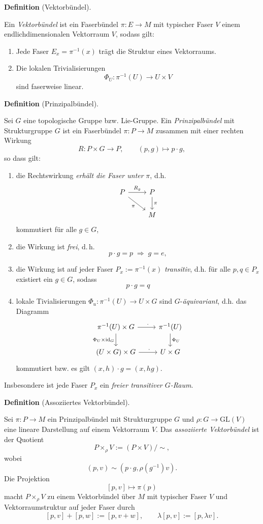 \documentclass[10pt, letterpaper]{article}
\newcommand{\id}{\operatorname{id}}
\newcommand{\GL}{\mathrm{GL}}
\newcommand{\CustomHeading}[3]{%
  \par\medskip\noindent%
  \textbf{#1 #2} \textnormal{(#3)}.\enskip%
}
\newenvironment{DEF}[2]{\CustomHeading{Definition}{#1}{#2}}{}
\begin{document}
\begin{DEF}{}{Vektorbündel}
Ein \emph{Vektorbündel} ist ein Faserbündel $\pi:E\to M$ mit typischer Faser $V$ einem endlichdimensionalen Vektorraum $V$, sodass gilt:
\begin{enumerate}
  \item Jede Faser $E_x=\pi^{-1}(x)$ trägt die Struktur eines Vektorraums.
  \item Die lokalen Trivialisierungen
        \[
        \Phi_U:\pi^{-1}(U)\to U\times V
        \]
        sind faserweise linear.
\end{enumerate}
\end{DEF}

\begin{DEF}{}{Prinzipalbündel}
Sei $G$ eine topologische Gruppe bzw. Lie-Gruppe. Ein \emph{Prinzipalbündel}
mit Strukturgruppe $G$ ist ein Faserbündel $\pi:P\to M$ zusammen mit einer rechten Wirkung
\[
R: P\times G\to P,\qquad (p,g)\mapsto p\cdot g,
\]
so dass gilt:
\begin{enumerate}
    \item die Rechtswirkung \emph{erhält die Faser unter} $\pi$, d.h. 
    \[
    \begin{tikzcd}
    P \arrow[r,"R_g"] \arrow[dr,"\pi"'] & P \arrow[d,"\pi"] \\
    & M
    \end{tikzcd}
    \]
    kommutiert für alle $g\in G$,
    \item die Wirkung ist \emph{frei}, d.\,h.
    \[
    p\cdot g=p \;\Rightarrow\; g=e,
    \]
    \item die Wirkung ist auf jeder Faser $P_x:=\pi^{-1}(x)$ \emph{transitiv}, d.h. für alle $p,q\in P_x$ existiert ein $g\in G$, sodass 
    $$p\cdot g=q$$
    \item lokale Tivialisierungen $\Phi_u:\pi^{-1}(U)\to U\times G$ sind $G$-\emph{äquivariant}, d.h. das Diagramm
    \[
    \begin{tikzcd}
    \pi^{-1}(U)\times G \arrow[r,"\ \ \cdot\ "] \arrow[d,"\Phi_U\times \id_G"'] & \pi^{-1}(U) \arrow[d,"\Phi_U"] \\
    (U\times G)\times G \arrow[r,"\ \ \cdot\ "] & U\times G
    \end{tikzcd}
    \]
    kommutiert bzw. es gilt $(x,h)\cdot g=(x,hg)$.
\end{enumerate}
Insbesondere ist jede Faser $P_x$ ein \emph{freier transitiver $G$-Raum}.
\end{DEF}


\begin{DEF}{}{Assoziiertes Vektorbündel}
Sei \(\pi:P\to M\) ein Prinzipalbündel mit Strukturgruppe \(G\) und $\rho:G\to \GL(V)$ eine lineare Darstellung auf einem Vektorraum \(V\). Das \emph{assoziierte Vektorbündel}
ist der Quotient
\[
P\times_\rho V:=(P\times V)/\sim,
\]
wobei
\[
(p,v)\sim (p\cdot g,\rho(g^{-1})v).
\]
Die Projektion
\[
[p,v]\mapsto \pi(p)
\]
macht \(P\times_\rho V\) zu einem Vektorbündel über \(M\) mit typischer Faser \(V\) und Vektorraumstruktur auf jeder Faser durch
\[
[p,v]+[p,w]:=[p,v+w],
\qquad
\lambda [p,v]:=[p,\lambda v].
\]
\end{DEF}
\end{document}
